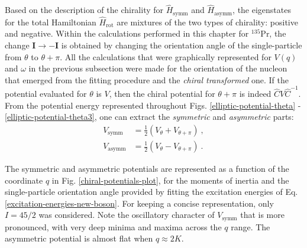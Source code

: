 Based on the description of the chirality for $\hat{H}_\text{symm}$ and $\hat{H}_\text{asymm}$, the eigenstates for the total Hamiltonian $\hat{H}_\text{rot}$ are mixtures of the two types of chirality: positive and negative. Within the calculations performed in this chapter for $^{135}$Pr, the change $\mathbf{I}\rightarrow\mathbf{-I}$ is obtained by changing the orientation angle of the single-particle from $\theta$ to $\theta+\pi$. All the calculations that were graphically represented for $V(q)$ and $\omega$ in the previous subsection were made for the orientation of the nucleon that emerged from the fitting procedure and the \emph{chiral transformed} one. If the potential evaluated for $\theta$ is $V$, then the chiral potential for $\theta+\pi$ is indeed $\hat{C}V\hat{C}^{-1}$. From the potential energy represented throughout Figs. \ref{elliptic-potential-theta} - \ref{elliptic-potential-theta3}, one can extract the \emph{symmetric} and \emph{asymmetric} parts:
\begin{align}
    V_\text{symm}&=\frac{1}{2}\left(V_\theta+V_{\theta+\pi}\right)\ , \nonumber \\
    V_\text{asymm}&=\frac{1}{2}\left(V_\theta-V_{\theta+\pi}\right)\ .
    \label{chiral-potentials-symmetric-asymmetric}
\end{align}

The symmetric and asymmetric potentials are represented as a function of the coordinate $q$ in Fig. \ref{chiral-potentials-plot}, for the moments of inertia and the single-particle orientation angle provided by fitting the excitation energies of Eq. \ref{excitation-energies-new-boson}. For keeping a concise representation, only $I=45/2$ was considered. Note the oscillatory character of $V_\text{symm}$ that is more pronounced, with very deep minima and maxima across the $q$ range. The asymmetric potential is almost flat when $q\approx2K$.


